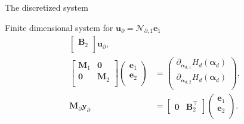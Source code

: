 \documentclass[aspectratio=169]{ISAE-Beamer}
\begin{document}
\begin{frame}{The discretized system}
{\begin{exampleblock}{Finite dimensional system for $\bm{u}_\partial = \mathcal{N}_{\partial, 1} \displaystyle \bm{e}_1$}
\begin{equation*}
\begin{aligned}
\begin{bmatrix}
	\mathbf{B}_2\\
	\end{bmatrix}
	\mathbf{u}_\partial, \\
	\begin{bmatrix}
	\mathbf{M}_1 & \mathbf{0} \\
	\mathbf{0} & \mathbf{M}_2 \\
	\end{bmatrix}
	\begin{pmatrix}
	\mathbf{e}_{1} \\
	\mathbf{e}_{2} \\
	\end{pmatrix}
	&= \begin{pmatrix}
	\partial_{\bm{\alpha}_{d, 1}} H_d(\bm{\alpha}_d)\\
	\partial_{\bm{\alpha}_{d, 2}} H_d(\bm{\alpha}_d)\\
	\end{pmatrix}, \\
	\mathbf{M}_\partial {\mathbf{y}_\partial} &= 
	\begin{bmatrix}
	\mathbf{0} & \mathbf{B}_2^\top 
	\end{bmatrix}\begin{pmatrix}
	\mathbf{e}_{1} \\
	\mathbf{e}_{2} \\
	\end{pmatrix}.
	\end{aligned}
	\end{equation*}
\end{exampleblock}


}


\end{frame}
\end{document}
